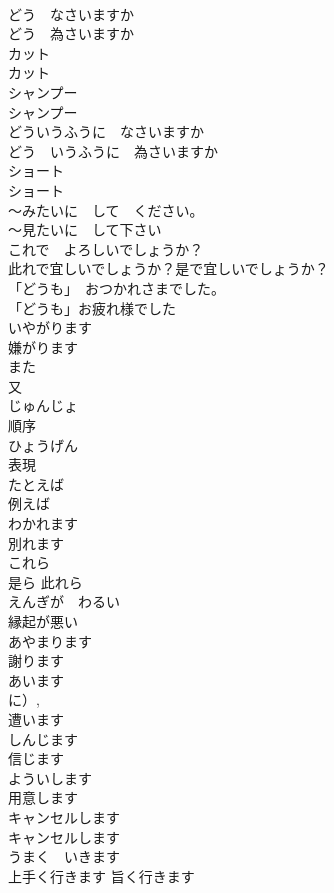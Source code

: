 \documentclass[8pt]{extreport}
\begin{document}
\begin{CJK}{UTF8}{min}
\\	どう　なさいますか	
\\	どう　為さいますか		
\\	カット	
\\	カット		
\\	シャンプー	
\\	シャンプー		
\\	どういうふうに　なさいますか	
\\	どう　いうふうに　為さいますか		
\\	ショート	
\\	ショート		
\\	〜みたいに　して　ください。	
\\	〜見たいに　して下さい		
\\	これで　よろしいでしょうか？	
\\	此れで宜しいでしょうか？是で宜しいでしょうか？		
\\	「どうも」　おつかれさまでした。	
\\	「どうも」お疲れ様でした		
\\	いやがります	
\\	嫌がります		
\\	また	
\\	又		
\\	じゅんじょ	
\\	順序		
\\	ひょうげん	
\\	表現		
\\	たとえば	
\\	例えば		
\\	わかれます	
\\	別れます		
\\	これら	
\\	是ら 此れら		
\\	えんぎが　わるい	
\\	縁起が悪い		
\\	あやまります	
\\	謝ります	
\\	あいます	
\\	に）, 
\\	遭います	
\\	しんじます	
\\	信じます		
\\	よういします	
\\	用意します	
\\	キャンセルします	
\\	キャンセルします	
\\	うまく　いきます	
\\	上手く行きます 旨く行きます	

\end{CJK}
\end{document}
